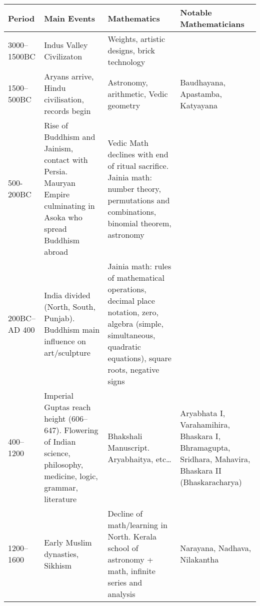 \begin{tabular}{l p{120pt} p{150pt} p{85pt}}
Period&Main Events&Mathematics&Notable Mathematicians\\\hline
3000--1500BC&Indus Valley Civilizaton&Weights, artistic designs, brick technology&\\
1500--500BC&Aryans arrive, Hindu civilisation, records begin&Astronomy, arithmetic, Vedic geometry&Baudhayana, Apastamba, Katyayana\\
500-200BC&Rise of Buddhism and Jainism, contact with Persia. Mauryan Empire culminating in Asoka who spread Buddhism abroad&Vedic Math declines with end of ritual sacrifice. Jainia math: number theory, permutations and combinations, binomial theorem, astronomy&\\
200BC--AD 400&India divided (North, South, Punjab). Buddhism main influence on
art/sculpture&Jainia math: rules of mathematical operations, decimal place
notation, zero, algebra (simple, simultaneous, quadratic equations), square
roots, negative signs&\\
400--1200&Imperial Guptas reach height (606--647). Flowering of Indian science, philosophy, medicine, logic, grammar, literature&Bhakshali Manuscript. Aryabhaitya, etc\ldots&Aryabhata I, Varahamihira, Bhaskara I, Bhramagupta, Sridhara, Mahavira, Bhaskara II (Bhaskaracharya)\\
1200--1600&Early Muslim dynasties, Sikhism&Decline of math/learning in North. Kerala school of astronomy + math, infinite series and analysis&Narayana, Nadhava, Nilakantha
\end{tabular}

\fi

